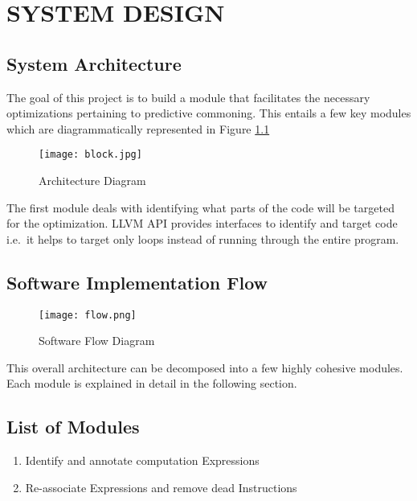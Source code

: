 \chapter{SYSTEM DESIGN} %

\section{System Architecture}
The goal of this project is to build a module that facilitates the necessary optimizations pertaining to predictive commoning. This entails a few key modules which are diagrammatically represented in Figure \ref{ArchDia}
\newline

\begin{figure}[H]
	\centering
	\texttt{[image: block.jpg]}
	\caption{Architecture Diagram}
	\label{ArchDia}	
\end{figure}


The first module deals with identifying what parts of the code will be targeted for the optimization. LLVM API provides interfaces to identify and target code i.e.\ it helps to target only loops instead of running through the entire program. \\ 

\section{Software Implementation Flow}

\begin{figure}[H]
	\centering
	\texttt{[image: flow.png]}
	\caption{Software Flow Diagram}
	\label{Software Flow}	
\end{figure}


This overall architecture can be decomposed into a few highly cohesive modules. Each module is explained in detail in the following section.

\section{List of Modules}
\begin{enumerate}
	\item Identify and annotate computation Expressions
	\item Re-associate Expressions and remove dead Instructions
\end{enumerate}


